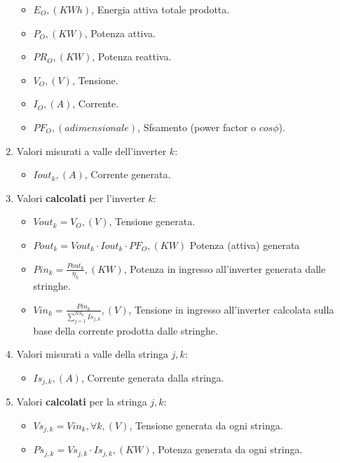 \begin{enumerate}
\begin{itemize}
\item$E_O, (KWh)$, Energia attiva totale prodotta.
\item$P_O, (KW)$, Potenza attiva.
\item$PR_O, (KW)$, Potenza reattiva.
\item$V_O, (V)$, Tensione.
\item$I_O, (A)$, Corrente.
\item$PF_O, (adimensionale)$, Sfsamento (power factor o $cos \phi$).
\end{itemize}
\item Valori misurati a valle dell'inverter $k$:
\begin{itemize}
\item$Iout_{k}, (A)$, Corrente generata.
\end{itemize}
\item Valori \textbf{calcolati} per l'inverter $k$:
\begin{itemize}
\item$Vout_{k} = V_O, (V)$, Tensione generata.
\item$Pout_{k} = Vout_{k} \cdot Iout_{k}  \cdot PF_O, (KW)$ Potenza
  (attiva) generata
\item$Pin_{k} = \frac{Pout_k}{\eta _k}, (KW)$, Potenza in ingresso
  all'inverter generata dalle stringhe.
\item$Vin_{k} = \frac{Pin_k}{\sum_{j=1}^{NS_k}{Is_{j, k}}}, (V)$, Tensione
  in ingresso all'inverter
  calcolata sulla base della corrente prodotta dalle stringhe.
\end{itemize}
\item Valori misurati a valle della stringa $j, k$:
\begin{itemize}
\item$Is_{j, k}, (A)$, Corrente generata dalla stringa.
\end{itemize}
\item Valori \textbf{calcolati} per la stringa $j, k$:
\begin{itemize}
\item$Vs_{j, k} = Vin_{k}, \forall k, (V)$, Tensione generata da ogni stringa.
\item$Ps_{j, k} = Vs_{j,k} \cdot Is_{j,k}, (KW)$, Potenza generata da ogni
  stringa.
\end{itemize}
\end{enumerate}



